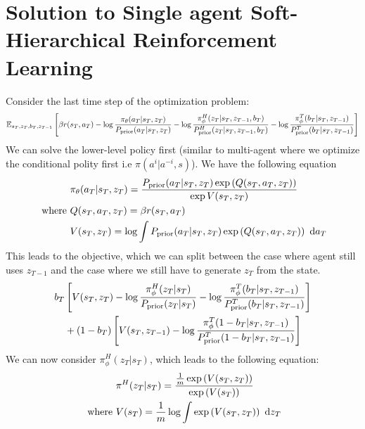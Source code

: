 \section{Solution to Single agent Soft-Hierarchical Reinforcement Learning}
\label{appx:chap4-soft-single-HRL}
Consider the last time step of the optimization problem: 
\begin{equation*}
    \mathbb{E}_{s_T, z_{T}, b_T, z_{T-1}}\left[ \beta r(s_T, a_T) - \log \frac{\pi_{\theta}(a_T | s_T, z_T)}{P_{\text{prior}}(a_T | s_T, z_T)}  - \log \frac{\pi^H_{\phi}(z_T | s_T, z_{T-1}, b_T)}{P_{\text{prior}}^H(z_T | s_T, z_{T-1}, b_T)} - \log \frac{\pi^T_{\phi}(b_T | s_T, z_{T-1}) }{P_{\text{prior}}^T(b_T | s_T, z_{T-1})} \right]
\end{equation*}
We can solve the lower-level policy first (similar to multi-agent where we optimize the conditional polity first i.e $\pi(a^i | a^{-i}, s)$). We have the following equation 
\begin{equation}
\begin{aligned}
\label{eqn:first-low-level-policy}
    &\pi_{\theta}(a_T | s_T, z_T) = \frac{P_{\text{prior}}(a_T | s_T, z_T)\exp\left( Q(s_T, a_T, z_T) \right)}{\exp V(s_T, z_T)} \\
    \text{ where }&Q(s_T, a_T, z_T) = \beta r(s_T, a_T) \\
    &V(s_T, z_T) = \log \int P_{\text{prior}}(a_T | s_T, z_T)\exp\left( Q(s_T, a_T, z_T) \right) \ \mathrm{d} a_T
\end{aligned} 
\end{equation}
This leads to the objective, which we can split between the case where agent still uses $z_{T-1}$ and the case where we still have to generate $z_T$ from the state. 
\begin{equation}
\begin{aligned}
    b_T&\left[ V(s_T, z_T) - \log \frac{\pi^H_\phi(z_T | s_T)}{P_{\text{prior}}(z_T | s_T)}- \log \frac{\pi^T_{\phi}(b_T | s_T, z_{T-1}) }{P_{\text{prior}}^T(b_T | s_T, z_{T-1})} \right] \\
    &+(1-b_T)\left[ V(s_T, z_{T-1}) - \log \frac{\pi^T_{\phi}(1-b_T | s_T, z_{T-1}) }{P_{\text{prior}}^T(1-b_T | s_T, z_{T-1})}  \right]
\end{aligned}
\end{equation}
We can now consider $\pi^H_\phi(z_T | s_T)$, which leads to the following equation:
\begin{equation}
\begin{aligned}
    &\pi^H(z_T | s_T) = \frac{\frac{1}{m}\exp\left( V(s_T, z_T) \right)}{\exp\left( V(s_T) \right)}
    \\
    \text{ where }
    &V(s_T) =  \frac{1}{m}\log \int \exp\left( V(s_T, z_T) \right) \ \mathrm{d} z_T
\end{aligned} 
\end{equation}
